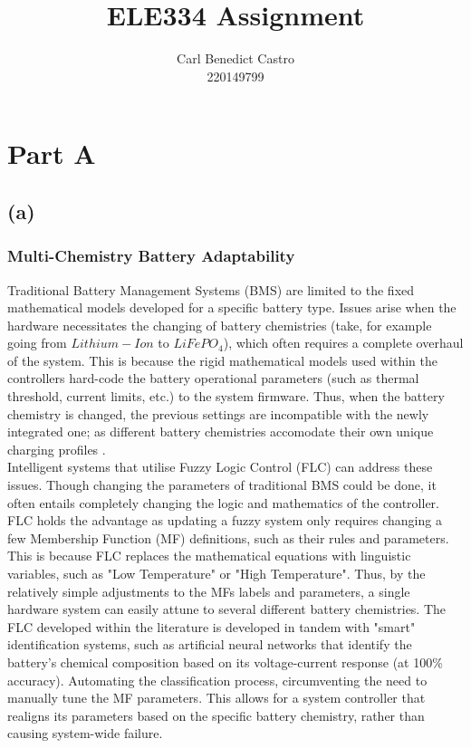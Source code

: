 \documentclass[12pt]{article}
\title{ELE334 Assignment}
\author{Carl Benedict Castro \\
220149799}
\begin{document}
\maketitle
\tableofcontents
\listoffigures
\listoftables

\newpage

\section{Part A}

\subsection{(a)}
\subsubsection{Multi-Chemistry Battery Adaptability}

Traditional Battery Management Systems (BMS) are limited to the fixed mathematical models developed for a specific battery type.
Issues arise when the hardware necessitates the changing of battery chemistries (take, for example going from $Lithium-Ion$ to $LiFePO_4$), which often requires a complete overhaul of the system.  
This is because the rigid mathematical models used within the controllers hard-code the battery operational parameters (such as thermal threshold, current limits, etc.) to the system firmware.
Thus, when the battery chemistry is changed, the previous settings are incompatible with the newly integrated one; as different battery chemistries accomodate their own unique charging profiles \cite{BMS}.
\\

Intelligent systems that utilise Fuzzy Logic Control (FLC) can address these issues.
Though changing the parameters of traditional BMS could be done, it often entails completely changing the logic and mathematics of the controller.
FLC holds the advantage as updating a fuzzy system only requires changing a few Membership Function (MF) definitions, such as their rules and parameters.
This is because FLC replaces the mathematical equations with linguistic variables, such as "Low Temperature" or "High Temperature".
Thus, by the relatively simple adjustments to the MFs labels and parameters, a single hardware system can easily attune to several different battery chemistries.
The FLC developed within the literature is developed in tandem with "smart" identification systems, such as artificial neural networks that identify the battery's chemical composition based on its voltage-current response (at 100\% accuracy)\cite{onehundred}. 
Automating the classification process, circumventing the need to manually tune the MF parameters.
This allows for a system controller that realigns its parameters based on the specific battery chemistry, rather than causing system-wide failure.
\\
\end{document}
